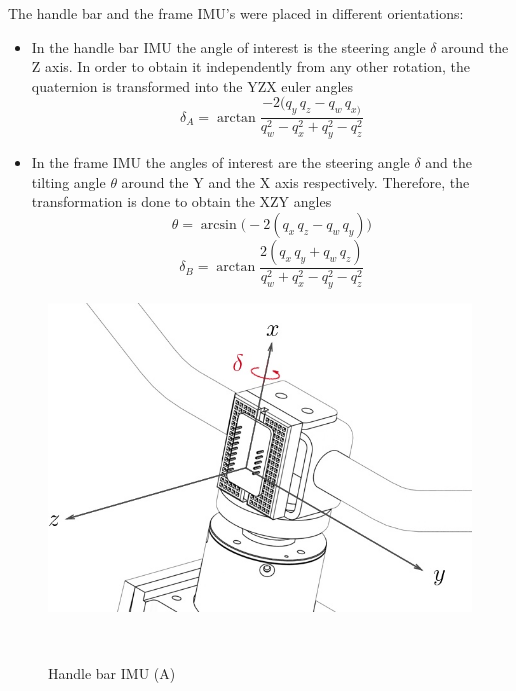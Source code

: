 \newpage
The handle bar and the frame IMU's were placed in different orientations:

\begin{itemize}
\begin{itemize}
\item In the handle bar IMU the angle of interest is the steering angle $\delta$ around the Z axis. In order to obtain it independently from any other rotation, the quaternion is transformed into the YZX euler angles
\[\delta_{A}=\arctan \frac{-2(q_{y}\,q_{z}-q_{w}\,q_{x)}}{q_{w}^2-q_{x}^2+q_{y}^2-q_{z}^2}\]

\item In the frame IMU the angles of interest are the steering angle $\delta$ and the tilting angle $\theta$ around the Y and the X axis respectively. Therefore, the transformation is done to obtain the XZY angles
\[\theta=\arcsin\big(-2(q_{x}\,q_{z}-q_{w}\,q_{y})\big)\]
\[\delta_{B}=\arctan\frac{2(q_{x}\,q_{y}+q_{w}\,q_{z})}{q_{w}^2+q_{x}^2-q_{y}^2-q_{z}^2}\]
\end{itemize}
\end{itemize}


%
%
\begin{figure}[h!]
	\centering
	\includegraphics[width=0.85\linewidth]{figs/05/IMU_A2}
	\caption{Handle bar IMU (A)}
	\\[1cm]
\end{figure}

